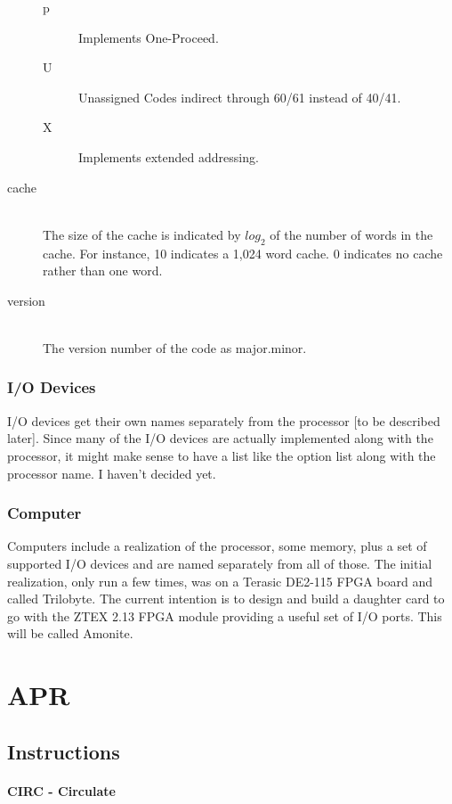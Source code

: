 \documentclass[12pt]{report}
\begin{document}
\begin{description}
\begin{description}
      \item[p] Implements One-Proceed.
      \item[U] Unassigned Codes indirect through 60/61 instead of 40/41.
      \item[X] Implements extended addressing.
    \end{description}
  \item[cache] \hfill \\ The size of the cache is indicated by $log_2$ of the number of
    words in the cache.  For instance, 10 indicates a 1,024 word cache.  0 indicates no
    cache rather than one word.
  \item[version] \hfill \\
    The version number of the code as major.minor.
\end{description}

\subsection{I/O Devices}

I/O devices get their own names separately from the processor [to be described later].
Since many of the I/O devices are actually implemented along with the processor, it might
make sense to have a list like the option list along with the processor name.  I haven't
decided yet.

\subsection{Computer}

Computers include a realization of the processor, some memory, plus a set of supported
I/O devices and are named separately from all of those.  The initial realization, only run
a few times, was on a Terasic DE2-115 FPGA board and called Trilobyte.  The current
intention is to design and build a daughter card to go with the ZTEX 2.13 FPGA module
providing a useful set of I/O ports.  This will be called Amonite.


\chapter{APR}

\section{Instructions}

\subsubsection{CIRC - Circulate}
\end{document}
